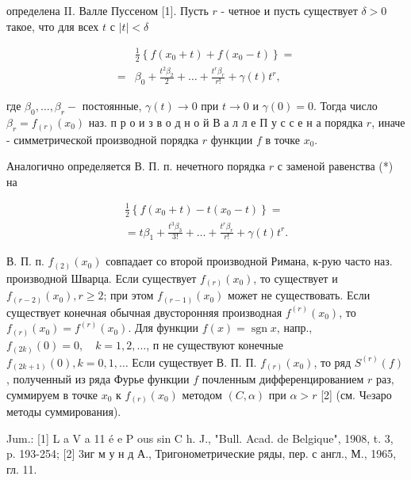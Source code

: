 \documentclass[10pt]{article}
\begin{document}
определена II. Валле Пуссеном [1]. Пусть $r$ - четное и пусть существует $\delta>0$ такое, что для всех $t$ с $|t|<\delta$



\[

\begin{aligned}

& \frac{1}{2}\left\{f\left(x_{0}+t\right)+f\left(x_{0}-t\right)\right\}= \\

= & \beta_{0}+\frac{t^{2} \beta_{2}}{2}+\ldots+\frac{t^{r} \beta_{r}}{r !}+\gamma(t) t^{r},

\end{aligned}

\]



где $\beta_{0}, \ldots, \beta_{r}-$ постоянные, $\gamma(t) \rightarrow 0$ при $t \rightarrow 0$ и $\gamma(0)=0$. Тогда число $\beta_{r}=f_{(r)}\left(x_{0}\right)$ наз. п р о и з в о д н о й В а л л е П у с с е н а порядка $r$, иначе - симметрической производной порядка $r$ функции $f$ в точке $x_{0}$.



Аналогично определяется В. П. п. нечетного порядка $r$ с заменой равенства (*) на



\[

\begin{gathered}

\frac{1}{2}\left\{f\left(x_{0}+t\right)-t\left(x_{0}-t\right)\right\}= \\

=t \beta_{1}+\frac{t^{3} \beta_{3}}{3 !}+\ldots+\frac{t^{r} \beta_{r}}{r !}+\gamma(t) t^{r} .

\end{gathered}

\]



В. П. п. $f_{(2)}\left(x_{0}\right)$ совпадает со второй производной Римана, к-рую часто наз. производной Шварца. Если существует $f_{(r)}\left(x_{0}\right)$, то существует и $f_{(r-2)}\left(x_{0}\right), r \geqslant 2$; при этом $f_{(r-1)}\left(x_{0}\right)$ может не существовать. Если существует конечная обычная двусторонняя производная $f^{(r)}\left(x_{0}\right)$, то $f_{(r)}\left(x_{0}\right)=f^{(r)}\left(x_{0}\right)$. Для функции $f(x)=\operatorname{sgn} x$, напр., $f_{(2 k)}(0)=0, \quad k=1,2, \ldots$, п не существуют конечные $f_{(2 k+1)}(0), k=0,1, \ldots$ Если существует В. П. П. $f_{(r)}\left(x_{0}\right)$, то ряд $S^{(r)}(f)$, полученный из ряда Фурье функции $f$ почленным дифференцированием $r$ раз, суммируем в точке $x_{0}$ к $f_{(r)}\left(x_{0}\right)$ методом $(C, \alpha)$ при $\alpha>r$ [2] (см. Чeзаро методы суммирования).



Jum.: [1] L a V a 11 é e P ous sin C h. J., "Bull. Acad. de Belgique", 1908, t. 3, p. 193-254; [2] 3иг м у н д А., Тригонометрические ряды, пер. с англ., М., 1965, гл. 11.
\end{document}
